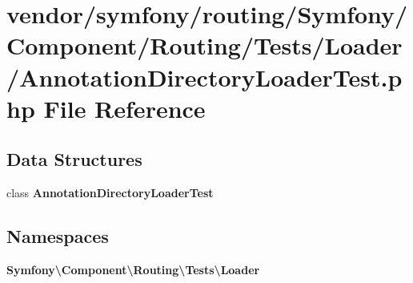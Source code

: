 \section{vendor/symfony/routing/\+Symfony/\+Component/\+Routing/\+Tests/\+Loader/\+Annotation\+Directory\+Loader\+Test.php File Reference}
\label{_annotation_directory_loader_test_8php}
\subsection*{Data Structures}
\begin{DoxyCompactItemize}
\item 
class {\bf Annotation\+Directory\+Loader\+Test}
\end{DoxyCompactItemize}
\subsection*{Namespaces}
\begin{DoxyCompactItemize}
\item 
 {\bf Symfony\textbackslash{}\+Component\textbackslash{}\+Routing\textbackslash{}\+Tests\textbackslash{}\+Loader}
\end{DoxyCompactItemize}
